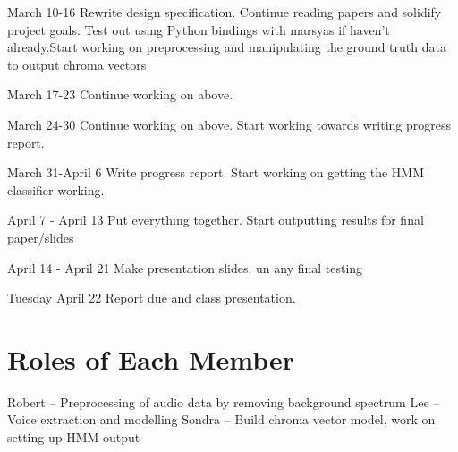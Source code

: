 \documentclass{article}
\begin{document}
{March 10-16\newline
Rewrite design specification. Continue reading papers and solidify project goals. Test out using Python 
bindings with marsyas if haven't already.Start working on preprocessing and 
manipulating the ground truth data to output chroma vectors\newline
\newline

March 17-23\newline
Continue working on above.\newline
\newline

March 24-30\newline 
Continue working on above. Start working towards writing progress report.\newline
\newline

March 31-April 6\newline
Write progress report. Start working on getting the HMM classifier working.\newline
\newline

April 7 - April 13\newline
Put everything together. Start outputting results for final paper/slides\newline
\newline

April 14 - April 21\newline
Make presentation slides. un any final testing\newline
\newline

Tuesday April 22\newline
Report due and class presentation.\newline
\newline

\section{Roles of Each Member}

Robert -- Preprocessing of audio data by removing background spectrum \newline
Lee -- Voice extraction and modelling\newline
Sondra -- Build chroma vector model, work on setting up HMM output\newline

\begin{thebibliography}{citations}


\end{thebibliography}}
\end{document}
